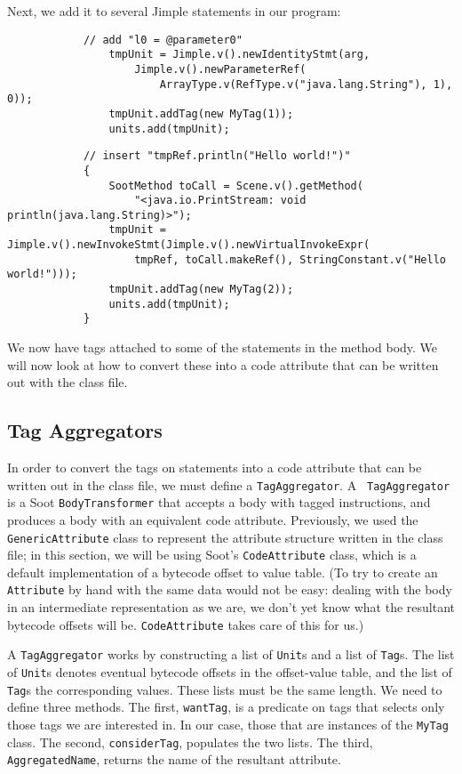 \documentclass{article}
\begin{document}
Next, we add it to several Jimple statements in our program:

\begin{verbatim}
            // add "l0 = @parameter0"
                tmpUnit = Jimple.v().newIdentityStmt(arg,
                    Jimple.v().newParameterRef(
                        ArrayType.v(RefType.v("java.lang.String"), 1), 0));
                tmpUnit.addTag(new MyTag(1));
                units.add(tmpUnit);
\end{verbatim}

\begin{verbatim}
            // insert "tmpRef.println("Hello world!")"
            {
                SootMethod toCall = Scene.v().getMethod(
                    "<java.io.PrintStream: void println(java.lang.String)>");
                tmpUnit = Jimple.v().newInvokeStmt(Jimple.v().newVirtualInvokeExpr(
                    tmpRef, toCall.makeRef(), StringConstant.v("Hello world!")));
                tmpUnit.addTag(new MyTag(2));
                units.add(tmpUnit);
            }
\end{verbatim}

We now have tags attached to some of the statements in the method body. We 
will now look at how to convert these into a code attribute that can be 
written out with the class file.

\subsection{Tag Aggregators}

In order to convert the tags on statements into a code attribute that can be 
written out in the class file, we must define a {\tt TagAggregator}. A {\tt 
TagAggregator} is a Soot {\tt BodyTransformer} that accepts a body with tagged 
instructions, and produces a body with an equivalent code attribute. 
Previously, we used the {\tt GenericAttribute} class to represent the 
attribute structure written in the class file; in this section, we will be 
using Soot's {\tt CodeAttribute} class, which is a default implementation of a 
bytecode offset to value table. (To try to create an {\tt Attribute} by hand 
with the same data would not be easy: dealing with the body in an intermediate 
representation as we are, we don't yet know what the resultant bytecode 
offsets will be. {\tt CodeAttribute} takes care of this for us.)

A {\tt TagAggregator} works by constructing a list of {\tt Unit}s and a list 
of {\tt Tag}s. The list of {\tt Unit}s denotes eventual bytecode offsets in 
the offset-value table, and the list of {\tt Tag}s the corresponding values. 
These lists must be the same length. We need to define three methods. The 
first, {\tt wantTag}, is a predicate on tags that selects only those tags we 
are interested in. In our case, those that are instances of the {\tt MyTag} 
class. The second, {\tt considerTag}, populates the two lists. The third, {\tt 
AggregatedName}, returns the name of the resultant attribute.
\end{document}
